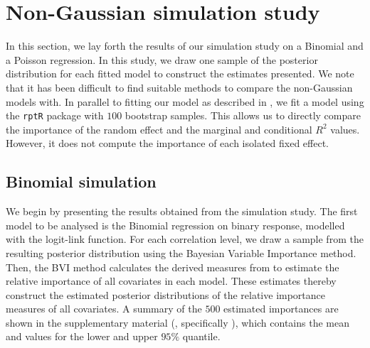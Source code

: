\section{Non-Gaussian simulation study}
In this section, we lay forth the results of our simulation study on a Binomial and a Poisson regression. In this study, we draw one sample of the posterior distribution for each fitted model to construct the estimates presented. We note that it has been difficult to find suitable methods to compare the non-Gaussian models with. In parallel to fitting our model as described in , we fit a model using the \texttt{rptR} package with $100$ bootstrap samples. This allows us to directly compare the importance of the random effect and the marginal and conditional $R^2$ values. However, it does not compute the importance of each isolated fixed effect.  
\subsection{Binomial simulation}
We begin by presenting the results obtained from the simulation study. The first model to be analysed is the Binomial regression on binary response, modelled with the logit-link function. For each correlation level, we draw a sample from the resulting posterior distribution using the Bayesian Variable Importance method. Then, the BVI method calculates the derived measures from  to estimate the relative importance of all covariates in each model. These estimates thereby construct the estimated posterior distributions of the relative importance measures of all covariates. A summary of the $500$ estimated importances are shown in the supplementary material (, specifically ), which contains the mean and values for the lower and upper $95\%$ quantile.
